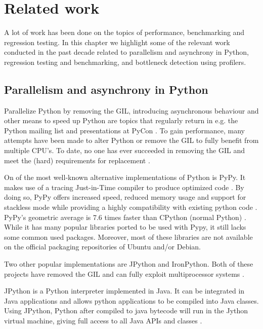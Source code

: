 \chapter{Related work}
\label{cpt:related_work}

A lot of work has been done on the topics of performance, benchmarking and regression testing.
In this chapter we highlight some of the relevant work conducted in the past decade related to parallelism and asynchrony in Python, regression testing and benchmarking, and bottleneck detection using profilers.

\section{Parallelism and asynchrony in Python}
\label{sct:parallelism_and_asynchrony_in_python}
Parallelize Python by removing the GIL, introducing asynchronous behaviour and other means to speed up Python are topics that regularly return in e.g. the Python mailing list and presentations at PyCon \cite{python2015global}.
To gain performance, many attempts have been made to alter Python or remove the GIL to fully benefit from multiple CPU's.
To date, no one has ever succeeded in removing the GIL and meet the (hard) requirements for replacement \cite{python2015global}.

On of the most well-known alternative implementations of Python is PyPy.
It makes use of a tracing Just-in-Time compiler to produce optimized code \cite{bolz2009tracing}.
By doing so, PyPy offers increased speed, reduced memory usage and support for stackless mode while providing a highly compatibility with existing python code \cite{pypy2016pypy}.
PyPy's geometric average is 7.6 times faster than CPython (normal Python) \cite{pypy2016speed}.
While it has many popular libraries ported to be used with Pypy, it still lacks some common used packages.
Moreover, most of these libraries are not available on the official packaging repositories of Ubuntu and/or Debian.

Two other popular implementations are JPython and IronPython.
Both of these projects have removed the GIL and can fully exploit multiprocessor systems \cite{python2015global}.

JPython is a Python interpreter implemented in Java. It can be integrated in Java applications and allows python applications to be compiled into Java classes.
Using JPython, Python after compiled to java bytecode will run in the Jython virtual machine, giving full access to all Java APIs and classes \cite{jython2016why}.

